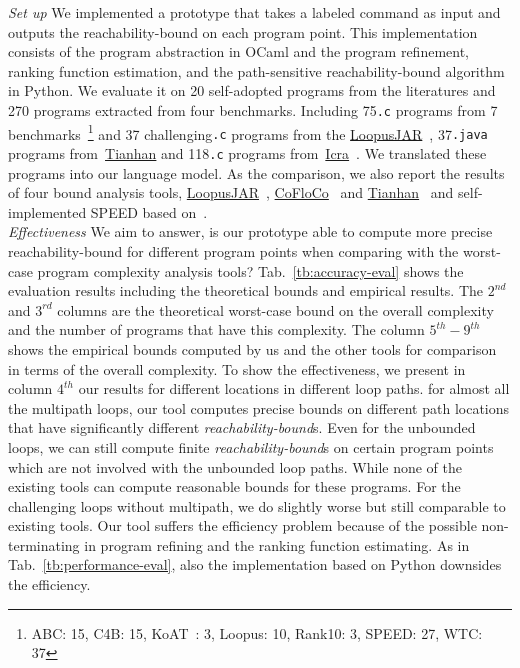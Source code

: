 \emph{Set up} We implemented a prototype {\THESYSTEM} that takes a labeled command as input 
and outputs the reachability-bound on each program point.
This implementation consists of the 
program abstraction in OCaml and the program refinement, ranking function estimation, and the path-sensitive reachability-bound algorithm in Python.
We evaluate it on 20 self-adopted programs from the literatures and 270 programs extracted from four benchmarks. 
Including 75{\tt .c} programs from 7 benchmarks~\cite{BenchmarkLoops}\footnote{ABC: 15, C4B: 15, KoAT~\cite{BrockschmidtEFFG14,FalkeKS12,FalkeKS11}: 3, Loopus: 10, Rank10: 3, SPEED: 27, WTC: 37} and 37 challenging{\tt .c} programs 
from the \hyperlink{https://forsyte.at/static/people/sinn/loopusJAR/index.html}{LoopusJAR}~\cite{BenchmarkLoops,SinnZV17},
37{\tt .java} programs from~\hyperlink{https://zenodo.org/record/5140586\#.Y5pBoC-B1QI}{Tianhan}\cite{BenchmarkTianhan,LuCT21}
and 118{\tt .c} programs from~\hyperlink{https://github.com/icra-team/icra}{Icra}~\cite{BenchmarkIcra,KincaidBCR19,CyphertBKR19}.
We translated these programs into our language model.
As the comparison, we also report the results of four bound analysis tools, 
\hyperlink{https://forsyte.at/software/loopus/}{LoopusJAR}~\cite{SinnZV17},
\hyperlink{https://github.com/aeflores/CoFloCo/tree/master/src}{CoFloCo}~\cite{ToolCofloco,Montoya17,Flores-Montoya16,Flores-MontoyaH14}
and \hyperlink{https://zenodo.org/record/5140586\#.Y5pBoC-B1QI}{Tianhan}~\cite{BenchmarkTianhan}
and self-implemented SPEED based on~\cite{GulwaniJK09}.
\\
\emph{Effectiveness} We aim to answer, is our prototype able to compute more precise reachability-bound for different program points when comparing with the worst-case program
complexity analysis tools?
Tab.~\ref{tb:accuracy-eval} shows the evaluation results including the theoretical bounds and empirical results.
The $2^{nd}$ and $3^{rd}$ columns are the theoretical worst-case bound on the overall complexity and the number of programs that have this complexity. The column $5^{th}-9^{th}$ shows the empirical bounds computed by us and the other tools for comparison in terms of the overall complexity.
To show the effectiveness, 
we present in column $4^{th}$ our results for different locations in different loop paths. for almost all the multipath loops, our tool computes precise bounds on different path locations that have significantly different \emph{reachability-bound}s.
Even for the unbounded loops, we can still compute finite \emph{reachability-bound}s on certain program points which are not involved with the unbounded loop paths.
While none of the existing tools can compute reasonable bounds for these programs.
For the challenging loops without multipath, we do slightly worse but still comparable to existing tools.
Our tool suffers the efficiency problem because of the possible non-terminating in program refining and the ranking function estimating.
As in Tab.~\ref{tb:performance-eval}, also the implementation based on Python downsides the efficiency.

